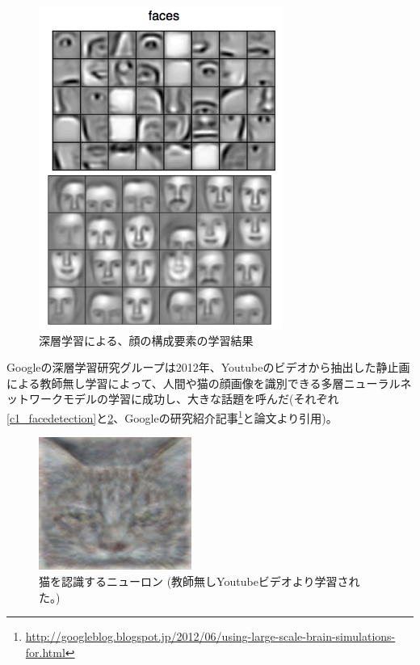 \begin{figure}[tbp]
 \centering
  \includegraphics[width=80mm]{img/c1/lee2009_faces}
 \caption{深層学習による、顔の構成要素の学習結果}
 \label{c1_lee2009_faces}
\end{figure}
\par

Googleの深層学習研究グループは2012年、Youtubeのビデオから抽出した静止画による教師無し学習によって、人間や猫の顔画像を識別できる多層ニューラルネットワークモデルの学習に成功し、大きな話題を呼んだ\cite{le2012building}(それぞれ\ref{c1_facedetection}と\ref{c1_catdetection}、Googleの研究紹介記事\footnote{\url{http://googleblog.blogspot.jp/2012/06/using-large-scale-brain-simulations-for.html}}と論文\cite{le2012building}より引用)。\par
\begin{figure}[tbp]
 \begin{center}
  \includegraphics[width=50mm]{img/c1/cat_detection}
 \end{center}
 \caption{猫を認識するニューロン (教師無しYoutubeビデオより学習された。)}
 \label{c1_catdetection}
\end{figure}


